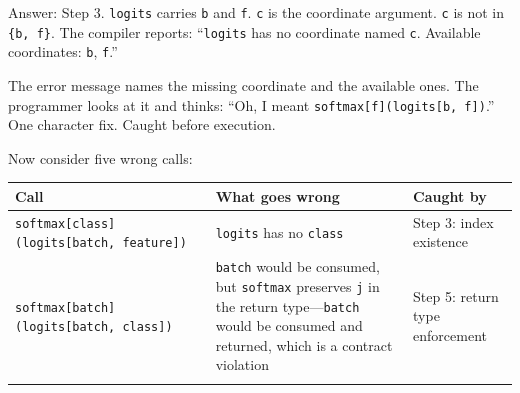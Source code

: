 \documentclass[11pt,titlepage]{article}
\begin{document}
Answer: Step 3. \texttt{logits} carries \texttt{b} and \texttt{f}.
\texttt{c} is the coordinate argument. \texttt{c} is not in
\texttt{\{b,\ f\}}. The compiler reports: ``\texttt{logits} has no
coordinate named \texttt{c}. Available coordinates: \texttt{b},
\texttt{f}.''

The error message names the missing coordinate and the available ones.
The programmer looks at it and thinks: ``Oh, I meant
\texttt{softmax{[}f{]}(logits{[}b,\ f{]})}.'' One character fix. Caught
before execution.

Now consider five wrong calls:

\begin{longtable}[]{@{}lll@{}}
\toprule
\begin{minipage}[b]{0.30\columnwidth}\raggedright
Call\strut
\end{minipage} & \begin{minipage}[b]{0.30\columnwidth}\raggedright
What goes wrong\strut
\end{minipage} & \begin{minipage}[b]{0.30\columnwidth}\raggedright
Caught by\strut
\end{minipage}\tabularnewline
\midrule
\endhead
\begin{minipage}[t]{0.30\columnwidth}\raggedright
\texttt{softmax{[}class{]}(logits{[}batch,\ feature{]})}\strut
\end{minipage} & \begin{minipage}[t]{0.30\columnwidth}\raggedright
\texttt{logits} has no \texttt{class}\strut
\end{minipage} & \begin{minipage}[t]{0.30\columnwidth}\raggedright
Step 3: index existence\strut
\end{minipage}\tabularnewline
\begin{minipage}[t]{0.30\columnwidth}\raggedright
\texttt{softmax{[}batch{]}(logits{[}batch,\ class{]})}\strut
\end{minipage} & \begin{minipage}[t]{0.30\columnwidth}\raggedright
\texttt{batch} would be consumed, but \texttt{softmax} preserves
\texttt{j} in the return type---\texttt{batch} would be consumed and
returned, which is a contract violation\strut
\end{minipage} & \begin{minipage}[t]{0.30\columnwidth}\raggedright
Step 5: return type enforcement\strut
\end{minipage}\tabularnewline
\begin{minipage}[t]{0.30\columnwidth}\raggedright

\end{minipage}
\end{longtable}
\end{document}
